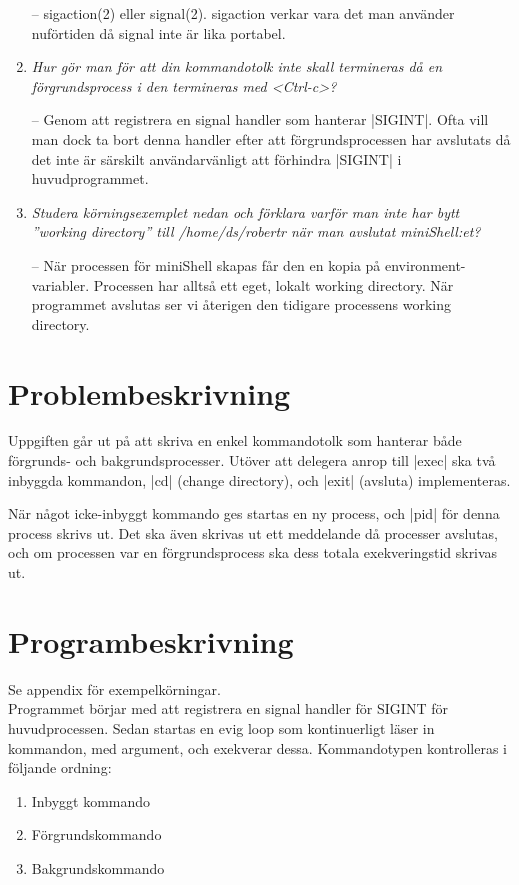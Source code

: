 \documentclass[paper=a4, fontsize=11pt]{scrartcl} %
\numberwithin{equation}{section} %
\numberwithin{figure}{section} %
\numberwithin{table}{section} %
\begin{document}
\begin{enumerate}[1)]
-- sigaction(2) eller signal(2). sigaction verkar vara det man använder nuförtiden då signal inte är lika portabel.

\item
\emph{Hur gör man för att din kommandotolk inte skall termineras 
då en förgrundsprocess i den termineras med <Ctrl-c>?}

-- Genom att registrera en signal handler som hanterar |SIGINT|.
Ofta vill man dock ta bort denna handler efter att förgrundsprocessen har avslutats
då det inte är särskilt användarvänligt att förhindra |SIGINT| i huvudprogrammet.

\item
\emph{Studera körningsexemplet nedan och förklara varför man inte har bytt 
''working directory'' till /home/ds/robertr när man avslutat miniShell:et?}

-- När processen för miniShell skapas får den en kopia på environment-variabler. Processen har alltså ett eget, lokalt 
working directory. När programmet avslutas ser vi återigen den tidigare processens working directory.

\end{enumerate}

\section{Problembeskrivning}

Uppgiften går ut på att skriva en enkel kommandotolk 
som hanterar både förgrunds- och bakgrundsprocesser.
Utöver att delegera anrop till |exec| ska två inbyggda kommandon,
 |cd| (change directory), och |exit| (avsluta) implementeras.

När något icke-inbyggt kommando ges startas en ny process, och |pid| för denna process skrivs ut.
Det ska även skrivas ut ett meddelande då processer avslutas, och om processen var en förgrundsprocess ska dess totala exekveringstid skrivas ut.


\section{Programbeskrivning}

Se appendix för exempelkörningar.\\

Programmet börjar med att registrera en signal handler för SIGINT för huvudprocessen.
Sedan startas en evig loop som kontinuerligt läser in kommandon, med argument, och exekverar dessa.
Kommandotypen kontrolleras i följande ordning:
\begin{enumerate}
\item{Inbyggt kommando}
\item{Förgrundskommando}
\item{Bakgrundskommando}
\end{enumerate}
\end{document}
